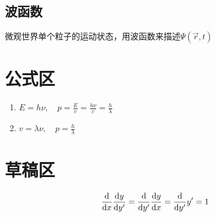 \documentclass{article}
\begin{document}
\subsection{波函数}
微观世界单个粒子的运动状态，用波函数来描述$\Psi(\vec{r},t)$

\section{公式区}
\begin{enumerate}[label=(\alph*)]
	\item $E=h\nu,\quad p=\frac{E}{c}=\frac{h\nu}{c}=\frac{h}{\lambda}$
	\item $v=\lambda \nu,\quad p=\frac{h}{\lambda}$
\end{enumerate}

\section{草稿区}
\[\frac{\dif}{\dif x}\frac{\dif y}{\dif y'}=\frac{\dif}{\dif y'}\frac{\dif y}{\dif x}=\frac{\dif}{\dif y'}y'=1\]
\end{document}

